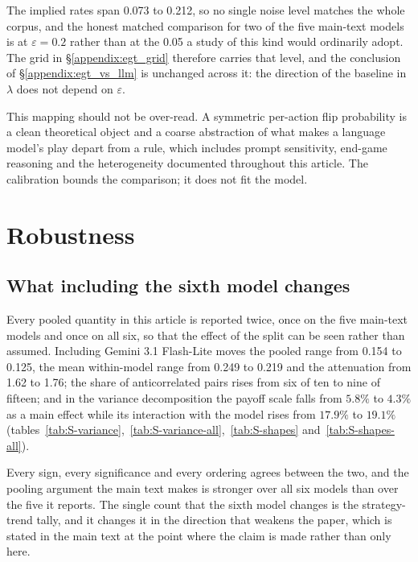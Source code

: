 \documentclass[openacc]{rsproca_new}
\newcommand{\lam}{\lambda}
\begin{document}
The implied rates span 0.073 to 0.212, so no single noise level matches the
whole corpus, and the honest matched comparison for two of the five main-text
models is at $\varepsilon = 0.2$ rather than at the 0.05 a study of this kind
would ordinarily adopt. The grid in \S\ref{appendix:egt_grid} therefore carries
that level, and the conclusion of \S\ref{appendix:egt_vs_llm} is unchanged
across it: the direction of the baseline in $\lam$ does not depend on
$\varepsilon$.

This mapping should not be over-read. A symmetric per-action flip probability
is a clean theoretical object and a coarse abstraction of what makes a language
model's play depart from a rule, which includes prompt sensitivity, end-game
reasoning and the heterogeneity documented throughout this article. The
calibration bounds the comparison; it does not fit the model.


\section{Robustness}\label{appendix:robustness}

\subsection{What including the sixth model changes}\label{appendix:robust_sixth}

Every pooled quantity in this article is reported twice, once on the five
main-text models and once on all six, so that the effect of the split can be
seen rather than assumed. Including Gemini 3.1 Flash-Lite moves the pooled
range from 0.154 to 0.125, the mean within-model range from 0.249 to 0.219 and
the attenuation from 1.62 to 1.76; the share of anticorrelated pairs rises from
six of ten to nine of fifteen; and in the variance decomposition the payoff
scale falls from $5.8\%$ to $4.3\%$ as a main effect while its interaction with
the model rises from $17.9\%$ to $19.1\%$
(tables~\ref{tab:S-variance},~\ref{tab:S-variance-all},~\ref{tab:S-shapes}
and~\ref{tab:S-shapes-all}).

Every sign, every significance and every ordering agrees between the two, and
the pooling argument the main text makes is stronger over all six models than
over the five it reports. The single count that the sixth model changes is the
strategy-trend tally, and it changes it in the direction that weakens the
paper, which is stated in the main text at the point where the claim is made
rather than only here.
\end{document}
